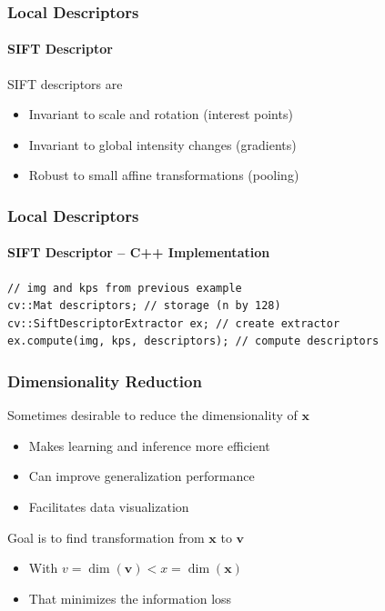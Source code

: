 \documentclass[xetex,professionalfont]{beamer}
\renewcommand{\vec}[1]{\ensuremath{\mathbf{#1}}}
\newcommand{\vv}{\vec{v}}
\newcommand{\vx}{\vec{x}}
\begin{document}

\begin{frame}
\frametitle{Local Descriptors}
\framesubtitle{SIFT Descriptor}

SIFT descriptors are
\begin{itemize}
	\item Invariant to scale and rotation (interest points)
	\item Invariant to global intensity changes (gradients)
	\item Robust to small affine transformations (pooling)
\end{itemize}

\end{frame}


\begin{frame}[fragile]
\frametitle{Local Descriptors}
\framesubtitle{SIFT Descriptor -- C++ Implementation}

\begin{verbatim}
// img and kps from previous example
cv::Mat descriptors; // storage (n by 128)
cv::SiftDescriptorExtractor ex; // create extractor
ex.compute(img, kps, descriptors); // compute descriptors
\end{verbatim}

\end{frame}


\begin{frame}
\frametitle{Dimensionality Reduction}

Sometimes desirable to reduce the dimensionality of $\vx$
\begin{itemize}
	\item Makes learning and inference more efficient
	\item Can improve generalization performance %
	\item Facilitates data visualization
\end{itemize} %

\bigskip
Goal is to find transformation from $\vx$ to $\vv$
\begin{itemize}
	\item With $v=\dim(\vv)<x=\dim(\vx)$
	\item That minimizes the information loss
\end{itemize}

\end{frame}
\end{document}
